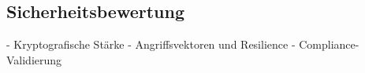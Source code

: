 \subsection{Sicherheitsbewertung} \label{sec:Sicherheitsbewertung}

- Kryptografische Stärke
- Angriffsvektoren und Resilience
- Compliance-Validierung